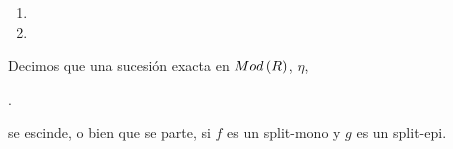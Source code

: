 \documentclass{article}
\begin{document}
\begin{enumerate}[label=\textbf{Ej \arabic*.}]
\begin{proof}
			\begin{equation*}\label{gsimh}\tag{**}
			\begin{split}
				hp'&=g\\
				gq'&=h.
			\end{split}
			\end{equation*}
		Así $p'p\in\ringmodhom{R}{A}{B}$, $qq'\in\ringmodhom{R}{B}{A}$ y
		\begin{equation*}
			\begin{split}
				h\lrprth{p'p}&=f\\
				f\lrprth{qq'}&=h,\\			
				\therefore\ f&\sim h.
			\end{split}
		\end{equation*}
		\end{proof}
		\item
		\item
	\end{enumerate}
\begin{define}
	Decimos que una sucesión exacta en $Mod\left(R\right)$, $\eta$, \begin{center}
		.
	\end{center}
	se escinde, o bien que se parte, si $f$ es un split-mono y $g$ es un split-epi.			
\end{define}
\end{document}
